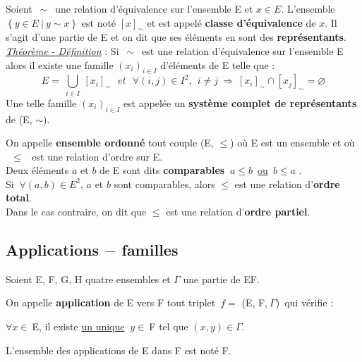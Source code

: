 Soient \(\,\sim\,\) une relation d'équivalence sur l'ensemble E et $x\in E$. L'ensemble \( \left\{ y\in E\ |\ y\sim x \right\} \) est noté \([x]_\sim\) et est appelé \textbf{classe d'équivalence} de $x$. Il s'agit d'une partie de E et on dit que ses éléments en sont des \textbf{représentants}.\vspace{0.1cm} \\
\emph{\underline{Théorème - Définition}} : Si  \(\,\sim\,\)  est une relation d'équivalence sur l'ensemble E alors il existe une famille \((x_i)_{i\in I}\) d'éléments de E telle que : \[E=\ \bigcup _{i\in I}\ [x_i]_{\sim}\ \ \ et\ \ \ \forall (i,j)\in I^2,\ \ i\neq j\  \Rightarrow\ [x_i]_{\sim} \cap [x_j]_{\sim} = \varnothing \] 
\indent Une telle famille \((x_i)_{i\in I}\) est appelée un \textbf{système complet de représentants} de (E, \(\sim\)).

\vspace{1.3cm}

On appelle \textbf{ensemble ordonné} tout couple (E, \(\leq\)) où E est un ensemble et où \ \(\leq\) \ est une relation d'ordre sur E.\vspace{0.1cm} \\
Deux éléments $a$ et $b$ de E sont dits \textbf{comparables} \ssi \(\ a\leq b\,\)  \underline{ou} \(\,b\leq a\) .\vspace{0.1cm} \\
Si \(\ \forall (a,b)\in E^2\),  $a$ et $b$ sont comparables, alors \(\leq\) est une relation d'\textbf{ordre total}. \\
Dans le cas contraire, on dit que  \(\leq\)  est une relation d'\textbf{ordre partiel}.

\newpage

\subsection{Applications $-$ familles}

\vspace{0.7cm}

\begin{center}
Soient E, F, G, H quatre ensembles et \(\Gamma\) une partie de E\x F.
\end{center}

\vspace{1cm}

\noindent
On appelle \textbf{application} de E vers F tout triplet \(\,f=\) (E, F,\(\ \Gamma\))\, qui vérifie :\vspace{-0.2cm}
\begin{center}
    \(\forall x\in\ \)E, il existe \underline{un unique} \(\ y\in \ \)F tel que \((x,y)\in \Gamma\).
\end{center}\vspace{-0.1cm}
L'ensemble des applications de E dans F est noté F.

